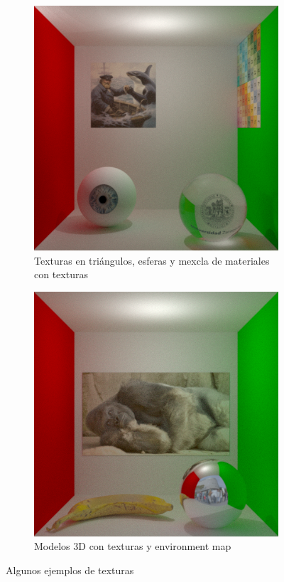 \documentclass{article}
\begin{document}
\begin{figure}[H]
  \begin{subfigure}[h]{0.4\linewidth}
    \includegraphics[width=\linewidth]{imgs/corneltex.png}
    \caption{Texturas en triángulos, esferas y mexcla de materiales con
      texturas}
  \end{subfigure}
  \hfill
  \begin{subfigure}[h]{0.4\linewidth}
    \includegraphics[width=\linewidth]{imgs/harambe.png}
    \caption{Modelos 3D con texturas y environment map}
  \end{subfigure}
  \caption{Algunos ejemplos de texturas}
\end{figure}
\end{document}
